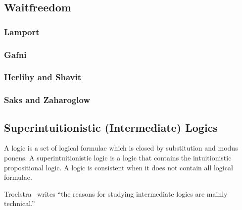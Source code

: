 \subsection{Waitfreedom}

\subsubsection{Lamport}

\subsubsection{Gafni}

\subsubsection{Herlihy and Shavit}

\subsubsection{Saks and Zaharoglow}

\subsection{Superintuitionistic (Intermediate) Logics}

A logic is a set of logical formulae which is closed by
substitution and modus ponens.
 A superintuitionistic logic is a logic
that contains the intuitionistic propositional logic.  A logic is consistent when it does not
contain all logical formulae.

Troelstra~\cite[p.~223]{goedelcollected} writes ``the reasons
for studying intermediate logics are mainly technical.''

